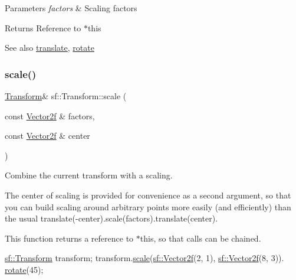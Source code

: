 \begin{DoxyParams}{Parameters}
{\em factors} & Scaling factors\\
\hline
\end{DoxyParams}
\begin{DoxyReturn}{Returns}
Reference to $\ast$this
\end{DoxyReturn}
\begin{DoxySeeAlso}{See also}
\hyperlink{classsf_1_1_transform_ab54f6c8070cc05e2afcb3145fbf4395a}{translate}, \hyperlink{classsf_1_1_transform_a3e548c3c9e3fb9d4bd43cf852669e555}{rotate} 
\end{DoxySeeAlso}
\mbox{\label{classsf_1_1_transform_a9198da375173127901f3095e0165ee1b}} 
\subsubsection{\texorpdfstring{scale()}{scale()}\hspace{0.1cm}{\footnotesize\ttfamily [4/4]}}
{\footnotesize\ttfamily \hyperlink{classsf_1_1_transform}{Transform}\& sf\+::\+Transform\+::scale (\begin{DoxyParamCaption}\item[{const \hyperlink{classsf_1_1_vector2}{Vector2f} \&}]{factors,  }\item[{const \hyperlink{classsf_1_1_vector2}{Vector2f} \&}]{center }\end{DoxyParamCaption})}



Combine the current transform with a scaling. 

The center of scaling is provided for convenience as a second argument, so that you can build scaling around arbitrary points more easily (and efficiently) than the usual translate(-\/center).scale(factors).translate(center).

This function returns a reference to $\ast$this, so that calls can be chained. 
\begin{DoxyCode}
\hyperlink{classsf_1_1_transform}{sf::Transform} transform;
transform.\hyperlink{classsf_1_1_transform_a3f46af807f69d74120fb836334268671}{scale}(\hyperlink{classsf_1_1_vector2}{sf::Vector2f}(2, 1), \hyperlink{classsf_1_1_vector2}{sf::Vector2f}(8, 3)).
      \hyperlink{classsf_1_1_transform_a3e548c3c9e3fb9d4bd43cf852669e555}{rotate}(45);
\end{DoxyCode}



